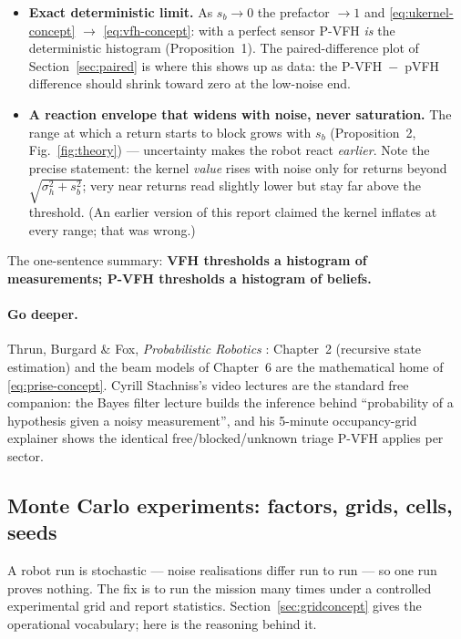 \begin{itemize}[leftmargin=1.6em]
\item \textbf{Exact deterministic limit.} As $s_b \to 0$ the prefactor
$\to 1$ and \eqref{eq:ukernel-concept} $\to$ \eqref{eq:vfh-concept}: with a
perfect sensor P-VFH \emph{is} the deterministic histogram
(Proposition~1). The paired-difference plot of
Section~\ref{sec:paired} is where this shows up as data: the P-VFH~$-$~pVFH
difference should shrink toward zero at the low-noise end.
\item \textbf{A reaction envelope that widens with noise, never
saturation.} The range at which a return starts to block grows with $s_b$
(Proposition~2, Fig.~\ref{fig:theory}) --- uncertainty makes
the robot react \emph{earlier}. Note the precise statement: the kernel
\emph{value} rises with noise only for returns beyond
$\sqrt{\sigma_h^2 + s_b^2}$; very near returns read slightly lower but stay
far above the threshold. (An earlier version of this report claimed the
kernel inflates at every range; that was wrong.)
\end{itemize}

The one-sentence summary: \textbf{VFH thresholds a histogram of measurements;
P-VFH thresholds a histogram of beliefs.}

\paragraph{Go deeper.} Thrun, Burgard \& Fox, \emph{Probabilistic Robotics}
\cite{thrun2005}: Chapter~2 (recursive state estimation) and the beam
models of Chapter~6 are the mathematical home of \eqref{eq:prise-concept}.
Cyrill Stachniss's video lectures are the standard free companion: the Bayes
filter lecture \cite{stachnissbayes} builds the inference behind ``probability
of a hypothesis given a noisy measurement'', and his 5-minute occupancy-grid
explainer \cite{stachnissgrid} shows the identical free/blocked/unknown
triage P-VFH applies per sector.

\subsection{Monte Carlo experiments: factors, grids, cells, seeds}
\label{sec:concept-mc}

A robot run is stochastic --- noise realisations differ run to run --- so one
run proves nothing. The fix is to run the mission many times under a
controlled experimental grid and report statistics. Section~\ref{sec:gridconcept}
gives the operational vocabulary; here is the reasoning behind it.

